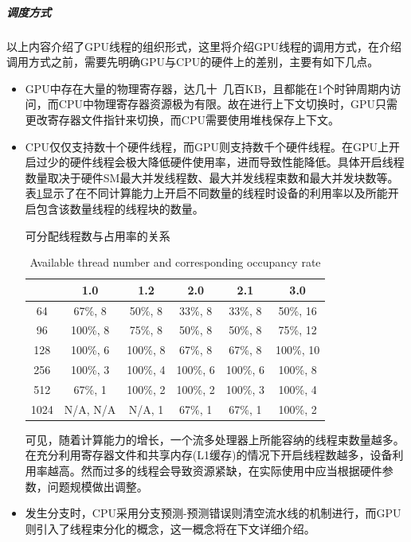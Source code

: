 \subparagraph{调度方式}
\par 以上内容介绍了GPU线程的组织形式，这里将介绍GPU线程的调用方式，在介绍调用方式之前，需要先明确GPU与CPU的硬件上的差别，主要有如下几点。
\begin{itemize}
	\item GPU中存在大量的物理寄存器，达几十~几百KB，且都能在1个时钟周期内访问，而CPU中物理寄存器资源极为有限。故在进行上下文切换时，GPU只需更改寄存器文件指针来切换，而CPU需要使用堆栈保存上下文。
	\item CPU仅仅支持数十个硬件线程，而GPU则支持数千个硬件线程。在GPU上开启过少的硬件线程会极大降低硬件使用率，进而导致性能降低。具体开启线程数量取决于硬件SM最大并发线程数、最大并发线程束数和最大并发块数等。表\ref{table-占用率}显示了在不同计算能力上开启不同数量的线程时设备的利用率以及所能开启包含该数量线程的线程块的数量。\\
	\begin{table}
		\centering
		\renewcommand{\thetable}{\arabic{section}-\arabic{table} }
		\renewcommand{\tablename}{表}
		\caption{可分配线程数与占用率的关系}
		\addtocounter{table}{-1}
		\renewcommand{\thetable}{\arabic{section}-\arabic{table} }
		\renewcommand{\tablename}{Table}
		\caption{Available thread number and corresponding occupancy rate}
		\begin{tabular}{cccccc}
			\toprule
			&	1.0	&1.2	&2.0	&2.1	&3.0 \\
			\midrule
			64	&	67\%, 8		&	50\%, 8		&	33\%, 8		&	33\%, 8		&	50\%, 16	\\
			96	&	100\%, 8	&	75\%, 8		&	50\%, 8		&	50\%, 8		&	75\%, 12	\\
			128	&	100\%, 6	&	100\%, 8	&	67\%, 8		&	67\%, 8		&	100\%, 10	\\
			256	&	100\%, 3	&	100\%, 4	&	100\%, 6	&	100\%, 6	&	100\%, 8	\\
			512	&	67\%, 1		&	100\%, 2	&	100\%, 2	&	100\%, 3	&	100\%, 4	\\
			1024&	N/A, N/A	&	N/A, 1		&	67\%, 1		&	67\%, 1		&	100\%, 2	\\
			
			\bottomrule
		\end{tabular} \label{table-占用率}
	\end{table}
	可见，随着计算能力的增长，一个流多处理器上所能容纳的线程束数量越多。在充分利用寄存器文件和共享内存(L1缓存)的情况下开启线程数越多，设备利用率越高。然而过多的线程会导致资源紧缺，在实际使用中应当根据硬件参数，问题规模做出调整。
	\item 发生分支时，CPU采用分支预测-预测错误则清空流水线的机制进行，而GPU则引入了线程束分化的概念，这一概念将在下文详细介绍。
\end{itemize}
